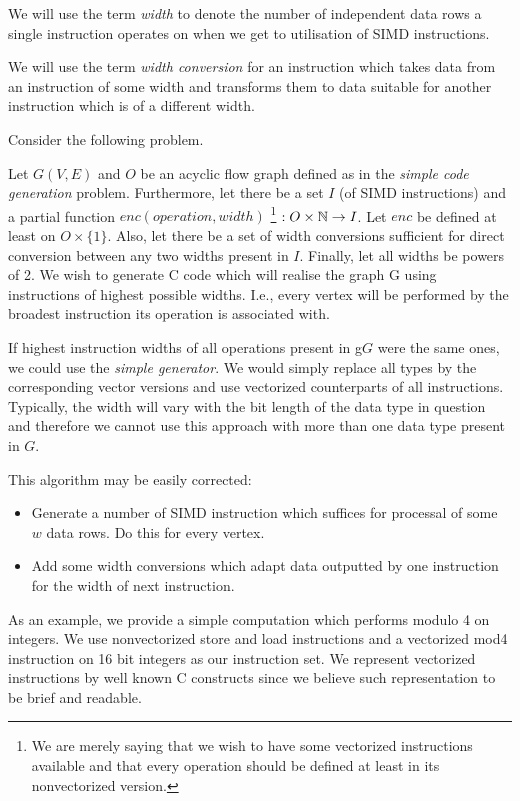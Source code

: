 \label{sec:vecgensec}

We will use the term \emph{width} to denote the number of independent data rows a single instruction operates on when we get to utilisation of SIMD instructions.
\myenddef

  We will use the term \emph{width conversion} for an instruction which takes data from an instruction of some width and transforms them to data suitable for another instruction which is of a different width. 
\myenddef

Consider the following problem.

  Let $G(V,E)$ and $O$ be an acyclic flow graph defined as in the \emph{simple code generation} problem. Furthermore, let there be a set $I$ (of SIMD instructions) and a partial function $enc (operation, width)$ \footnote{We are merely saying that we wish to have some vectorized instructions available and that every operation should be defined at least in its nonvectorized version.} $: O \times \mathbb{N} \rightarrow I$. Let $enc$ be defined at least on $O \times \{1\}$. Also, let there be a set of width conversions sufficient for direct conversion between any two widths present in $I$. Finally, let all widths be powers of 2. We wish to generate C code which will realise the graph G using instructions of highest possible widths. I.e., every vertex will be performed by the broadest instruction its operation is associated with. 
\myendprob

If highest instruction widths of all operations present in g$G$ were the same ones, we could use the \emph{simple generator}. We would simply replace all types by the corresponding vector versions and use vectorized counterparts of all instructions. Typically, the width will vary with the bit length of the data type in question and therefore we cannot use this approach with more than one data type present in $G$.


This algorithm may be easily corrected:
\begin{itemize}
  \item Generate a number of SIMD instruction which suffices for processal of some $w$ data rows. Do this for every vertex.
  \item Add some width conversions which adapt data outputted by one instruction for the width of next instruction.
\end{itemize}

As an example, we provide a simple computation which performs modulo 4 on integers. We use nonvectorized store and load instructions and a vectorized mod4 instruction on 16 bit integers as our instruction set. We represent vectorized instructions by well known C constructs since we believe such representation to be brief and readable.

